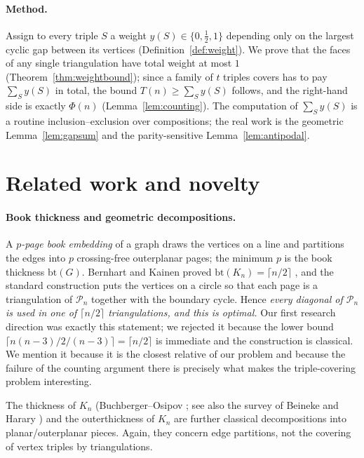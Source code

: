 \documentclass[11pt,a4paper]{article}
\theoremstyle{definition}
\newcommand{\Pol}{\mathcal{P}}
\begin{document}
\paragraph{Method.} Assign to every triple $S$ a weight $y(S) \in \{0, \tfrac12, 1\}$
depending only on the largest cyclic gap between its vertices
(Definition~\ref{def:weight}). We prove that the faces of any single
triangulation have total weight at most $1$ (Theorem~\ref{thm:weightbound}); since
a family of $t$ triples covers has to pay $\sum_S y(S)$ in total, the bound
$T(n) \ge \sum_S y(S)$ follows, and the right-hand side is exactly $\Phi(n)$
(Lemma~\ref{lem:counting}). The computation of $\sum_S y(S)$ is a routine
inclusion--exclusion over compositions; the real work is the geometric
Lemma~\ref{lem:gapsum} and the parity-sensitive Lemma~\ref{lem:antipodal}.

\section{Related work and novelty}\label{sec:related}

\paragraph{Book thickness and geometric decompositions.}
A \emph{$p$-page book embedding} of a graph draws the vertices on a line and
partitions the edges into $p$ crossing-free outerplanar pages; the minimum $p$ is
the book thickness $\mathrm{bt}(G)$. Bernhart and Kainen proved
$\mathrm{bt}(K_n) = \lceil n/2\rceil$ \cite{bernhartkaainen1979}, and the
standard construction puts the vertices on a circle so that each page is a
triangulation of $\Pol_n$ together with the boundary cycle. Hence
\emph{every diagonal of $\Pol_n$ is used in one of $\lceil n/2\rceil$ triangulations,
and this is optimal.} Our first research direction was exactly this statement;
we rejected it because the lower bound $\lceil n(n-3)/2 / (n-3) \rceil =
\lceil n/2\rceil$ is immediate and the construction is classical. We mention it
because it is the closest relative of our problem and because the failure of the
counting argument there is precisely what makes the triple-covering problem
interesting.

The thickness of $K_n$ (Buchberger--Osipov \cite{buchbergerosipov1998}; see also
the survey of Beineke and Harary \cite{beinekeharary1965}) and the outerthickness
of $K_n$ are further classical decompositions into planar/outerplanar pieces.
Again, they concern edge partitions, not the covering of vertex triples by
triangulations.
\end{document}
